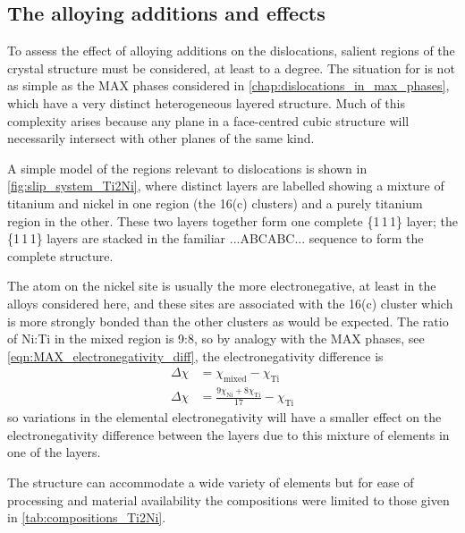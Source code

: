 \subsection{The alloying additions and effects}

To assess the effect of alloying additions on the dislocations, salient regions of the crystal structure must be considered, at least to a degree. The situation for  is not as simple as the MAX phases considered in \autoref{chap:dislocations_in_max_phases}, which have a very distinct heterogeneous layered structure. Much of this complexity arises because any plane in a face-centred cubic structure will necessarily intersect with other planes of the same kind.

A simple model of the regions relevant to dislocations is shown in \autoref{fig:slip_system_Ti2Ni}, where distinct layers are labelled showing a mixture of titanium and nickel in one region (the 16(c) clusters) and a purely titanium region in the other. These two layers together form one complete \{1\,1\,1\} layer; the \{1\,1\,1\} layers are stacked in the familiar ...ABCABC... sequence to form the complete structure.

The atom on the nickel site is usually the more electronegative, at least in the alloys considered here, and these sites are associated with the 16(c) cluster which is more strongly bonded than the other clusters as would be expected. The ratio of Ni:Ti in the mixed region is 9:8, so by analogy with the MAX phases, see \autoref{eqn:MAX_electronegativity_diff}, the electronegativity difference is
\begin{align}
\Delta \chi &= \chi_{\text{mixed}} - \chi_{\text{Ti}} \nonumber\\
\Delta \chi &= \frac{9\chi_{\text{Ni}} + 8\chi_{\text{Ti}}}{17} - \chi_{\text{Ti}}
\end{align}
so variations in the elemental electronegativity will have a smaller effect on the electronegativity difference between the layers due to this mixture of elements in one of the layers.

The  structure can accommodate a wide variety of elements but for ease of processing and material availability the compositions were limited to those given in \autoref{tab:compositions_Ti2Ni}. 

